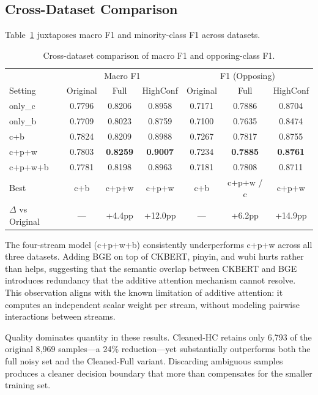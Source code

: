 ﻿\documentclass[12pt]{article}
\begin{document}
\subsection{Cross-Dataset Comparison}

Table~\ref{tab:cross-dataset} juxtaposes macro F1 and minority-class F1 across datasets.

\begin{table}[htbp]
\centering
\caption{Cross-dataset comparison of macro F1 and opposing-class F1.}
\label{tab:cross-dataset}
\begin{tabular}{lccc|ccc}
\toprule
& \multicolumn{3}{c|}{Macro F1} & \multicolumn{3}{c}{F1 (Opposing)} \\
Setting & Original & Full & HighConf & Original & Full & HighConf \\
\midrule
only\_c   & 0.7796 & 0.8206 & 0.8958 & 0.7171 & 0.7886 & 0.8704 \\
only\_b   & 0.7709 & 0.8023 & 0.8759 & 0.7100 & 0.7635 & 0.8474 \\
c+b       & 0.7824 & 0.8209 & 0.8988 & 0.7267 & 0.7817 & 0.8755 \\
c+p+w     & 0.7803 & \textbf{0.8259} & \textbf{0.9007} & 0.7234 & \textbf{0.7885} & \textbf{0.8761} \\
c+p+w+b   & 0.7781 & 0.8198 & 0.8963 & 0.7181 & 0.7808 & 0.8711 \\
\midrule
Best      & c+b    & c+p+w  & c+p+w  & c+b    & c+p+w / c   & c+p+w \\
$\Delta$ vs Original & --- & +4.4pp & +12.0pp & --- & +6.2pp & +14.9pp \\
\bottomrule
\end{tabular}
\end{table}

The four-stream model (c+p+w+b) consistently underperforms c+p+w across all three datasets. Adding BGE on top of CKBERT, pinyin, and wubi hurts rather than helps, suggesting that the semantic overlap between CKBERT and BGE introduces redundancy that the additive attention mechanism cannot resolve. This observation aligns with the known limitation of additive attention: it computes an independent scalar weight per stream, without modeling pairwise interactions between streams.

Quality dominates quantity in these results. Cleaned-HC retains only 6{,}793 of the original 8{,}969 samples---a 24\% reduction---yet substantially outperforms both the full noisy set and the Cleaned-Full variant. Discarding ambiguous samples produces a cleaner decision boundary that more than compensates for the smaller training set.
\end{document}
